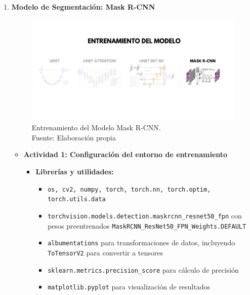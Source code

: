 \begin{enumerate}
\begin{itemize}
  \end{itemize}
\newpage
\item \textbf{Modelo de Segmentación: Mask R-CNN}
\begin{figure}[H]
	\begin{center}
		\includegraphics[width=1\textwidth]{4/figures/entrmask.png}
		\caption[Entrenamiento del Modelo Mask R-CNN]{Entrenamiento del Modelo Mask R-CNN.\\
		Fuente: Elaboración propia}
		\label{4:figentmask}
	\end{center}
\end{figure}
  \begin{itemize}
    \item \textbf{Actividad 1: Configuración del entorno de entrenamiento}
    \begin{itemize}
      \item \textbf{Librerías y utilidades:}
      \begin{itemize}
        \item \texttt{os, cv2, numpy, torch, torch.nn, torch.optim, torch.utils.data}
        \item \texttt{torchvision.models.detection.maskrcnn\_resnet50\_fpn} con pesos preentrenados \texttt{MaskRCNN\_ResNet50\_FPN\_Weights.DEFAULT}
        \item \texttt{albumentations} para transformaciones de datos, incluyendo \texttt{ToTensorV2} para convertir a tensores
        \item \texttt{sklearn.metrics.precision\_score} para cálculo de precisión
        \item \texttt{matplotlib.pyplot} para visualización de resultados
      \end{itemize}
  

\end{itemize}
\end{itemize}
\end{enumerate}
